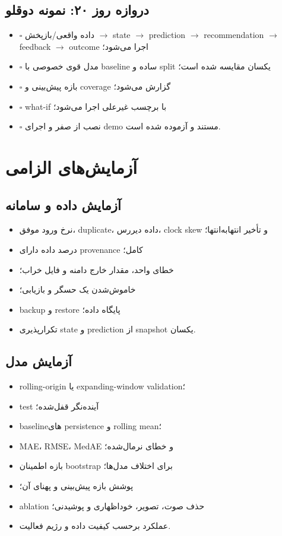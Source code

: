 \documentclass[11pt,a4paper]{article}
\newcommand{\checkmarkbox}{\(\square\)}
\begin{document}
\subsection{دروازه روز ۲۰: نمونه دوقلو}
\begin{itemize}
  \item \checkmarkbox{} داده واقعی/بازپخش $\rightarrow$ state $\rightarrow$ prediction $\rightarrow$ recommendation $\rightarrow$ feedback $\rightarrow$ outcome اجرا می‌شود؛
  \item \checkmarkbox{} مدل قوی خصوصی با baseline ساده و split یکسان مقایسه شده است؛
  \item \checkmarkbox{} بازه پیش‌بینی و coverage گزارش می‌شود؛
  \item \checkmarkbox{} what-if با برچسب غیرعلی اجرا می‌شود؛
  \item \checkmarkbox{} نصب از صفر و اجرای demo مستند و آزموده شده است.
\end{itemize}

\section{آزمایش‌های الزامی}

\subsection{آزمایش داده و سامانه}
\begin{itemize}
  \item نرخ ورود موفق، duplicate، داده دیررس، clock skew و تأخیر انتهابه‌انتها؛
  \item درصد داده دارای provenance کامل؛
  \item خطای واحد، مقدار خارج دامنه و فایل خراب؛
  \item خاموش‌شدن یک حسگر و بازیابی؛
  \item backup و restore پایگاه داده؛
  \item تکرارپذیری state و prediction از snapshot یکسان.
\end{itemize}

\subsection{آزمایش مدل}
\begin{itemize}
  \item rolling-origin یا expanding-window validation؛
  \item test آینده‌نگر قفل‌شده؛
  \item baselineهای persistence و rolling mean؛
  \item MAE، RMSE، MedAE و خطای نرمال‌شده؛
  \item بازه اطمینان bootstrap برای اختلاف مدل‌ها؛
  \item پوشش بازه پیش‌بینی و پهنای آن؛
  \item ablation حذف صوت، تصویر، خوداظهاری و پوشیدنی؛
  \item عملکرد برحسب کیفیت داده و رژیم فعالیت.
\end{itemize}
\end{document}
